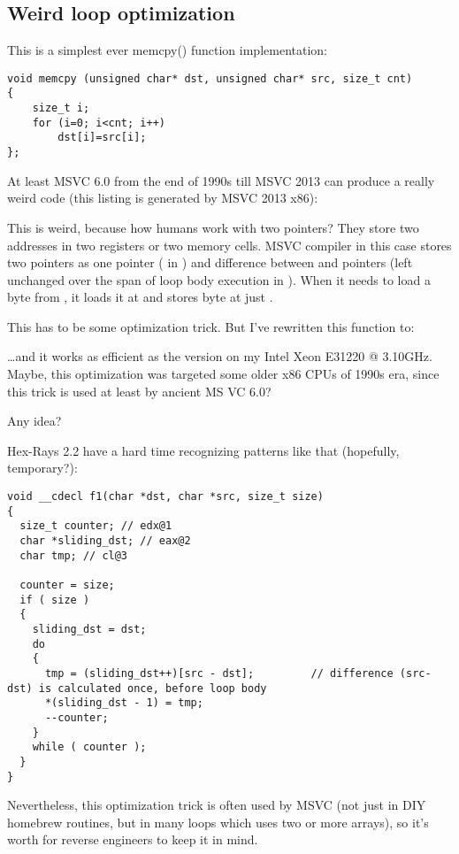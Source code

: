 \subsection{Weird loop optimization}

This is a simplest ever memcpy() function implementation:

\begin{lstlisting}[style=customc]
void memcpy (unsigned char* dst, unsigned char* src, size_t cnt)
{
	size_t i;
	for (i=0; i<cnt; i++)
		dst[i]=src[i];
};
\end{lstlisting}

At least MSVC 6.0 from the end of 1990s till MSVC 2013 can produce a really weird code (this listing is generated by MSVC 2013 x86):



This is weird, because how humans work with two pointers? They store two addresses in two registers or two memory cells.
MSVC compiler in this case stores two pointers as one pointer ( in \EAX) 
and difference between  and  pointers (left unchanged over the span of loop body execution in \ESI).
When it needs to load a byte from , it loads it at  and stores byte
at just .

This has to be some optimization trick. But I've rewritten this function to:



\dots and it works as efficient as the  version on my Intel Xeon E31220 @ 3.10GHz.
Maybe, this optimization was targeted some older x86 CPUs of 1990s era, since this trick is used at least by ancient MS VC 6.0?

Any idea?

Hex-Rays 2.2 have a hard time recognizing patterns like that (hopefully, temporary?):

\begin{lstlisting}[style=customc]
void __cdecl f1(char *dst, char *src, size_t size)
{
  size_t counter; // edx@1
  char *sliding_dst; // eax@2
  char tmp; // cl@3

  counter = size;
  if ( size )
  {
    sliding_dst = dst;
    do
    {
      tmp = (sliding_dst++)[src - dst];         // difference (src-dst) is calculated once, before loop body
      *(sliding_dst - 1) = tmp;
      --counter;
    }
    while ( counter );
  }
}
\end{lstlisting}

Nevertheless, this optimization trick is often used by MSVC (not just in \ac{DIY} homebrew  routines,
but in many loops which uses two or more arrays),
so it's worth for reverse engineers to keep it in mind.


